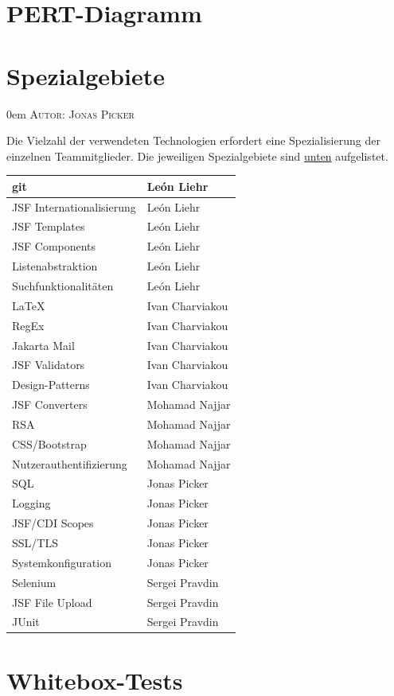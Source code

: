 \documentclass{article}
\makeatletter
\newcommand{\sectionauthor}[1]{
	{\parindent 0em \large \scshape Autor: #1 \par \nobreak \vspace*{1em}}
	\@afterheading
}
\makeatother
\begin{document}
\section{PERT-Diagramm}


\section{Spezialgebiete}
\sectionauthor{Jonas Picker}
Die Vielzahl der verwendeten Technologien erfordert eine Spezialisierung der einzelnen Teammitglieder. Die jeweiligen Spezialgebiete sind \hyperlink{speziell}{unten} aufgelistet.
\begin{table}[H]
\centering
\hypertarget{speziell}{}
\begin{tabular}{| p{6cm} | p{6cm} |}
	\hline
     	git & León Liehr \\
     	\hline
     	JSF Internationalisierung & León Liehr \\
     	\hline
    	JSF Templates & León Liehr \\	
     	\hline
     	JSF Components & León Liehr \\
     	\hline
     	Listenabstraktion & León Liehr \\
     	\hline
     	Suchfunktionalitäten & León Liehr \\
     	\hline
     	\hline
     	LaTeX & Ivan Charviakou \\
     	\hline
     	RegEx & Ivan Charviakou \\
     	\hline
     	Jakarta Mail & Ivan Charviakou \\
     	\hline
     	JSF Validators & Ivan Charviakou \\
     	\hline
     	Design-Patterns & Ivan Charviakou \\
     	\hline
     	\hline
     	JSF Converters & Mohamad Najjar \\
    	\hline
    	 RSA & Mohamad Najjar \\
    	\hline
    	 CSS/Bootstrap & Mohamad Najjar \\
     	\hline
     	Nutzerauthentifizierung & Mohamad Najjar \\
     	\hline
     	\hline
     	SQL & Jonas Picker \\
    	\hline
    	Logging & Jonas Picker \\
     	\hline
     	JSF/CDI Scopes & Jonas Picker \\
     	\hline
     	SSL/TLS & Jonas Picker \\
     	\hline
     	Systemkonfiguration & Jonas Picker \\
     	\hline
     	\hline
     	Selenium & Sergei Pravdin \\
     	\hline
     	JSF File Upload & Sergei Pravdin \\
     	\hline
     	JUnit & Sergei Pravdin \\
     	\hline
     	
\end{tabular}
\end{table}

\section{Whitebox-Tests}
\end{document}

